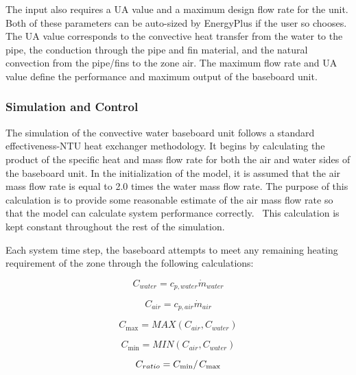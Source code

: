 The input also requires a UA value and a maximum design flow rate for the unit. Both of these parameters can be auto-sized by EnergyPlus if the user so chooses. The UA value corresponds to the convective heat transfer from the water to the pipe, the conduction through the pipe and fin material, and the natural convection from the pipe/fins to the zone air. The maximum flow rate and UA value define the performance and maximum output of the baseboard unit.

\subsubsection{Simulation and Control}\label{simulation-and-control-000}

The simulation of the convective water baseboard unit follows a standard effectiveness-NTU heat exchanger methodology. It begins by calculating the product of the specific heat and mass flow rate for both the air and water sides of the baseboard unit. In the initialization of the model, it is assumed that the air mass flow rate is equal to 2.0 times the water mass flow rate. The purpose of this calculation is to provide some reasonable estimate of the air mass flow rate so that the model can calculate system performance correctly.~ This calculation is kept constant throughout the rest of the simulation.

Each system time step, the baseboard attempts to meet any remaining heating requirement of the zone through the following calculations:

\begin{equation}
{C_{water}} = {c_{p,water}}{\dot m_{water}}
\end{equation}

\begin{equation}
{C_{air}} = {c_{p,air}}{\dot m_{air}}
\end{equation}

\begin{equation}
{C_{\max }} = MAX\left( {{C_{air}},{C_{water}}} \right)
\end{equation}

\begin{equation}
{C_{\min }} = MIN\left( {{C_{air}},{C_{water}}} \right)
\end{equation}

\begin{equation}
{C_{ratio}} = {{{C_{\min }}} \mathord{\left/ {\vphantom {{{C_{\min }}} {{C_{\max }}}}} \right. } {{C_{\max }}}}
\end{equation}

